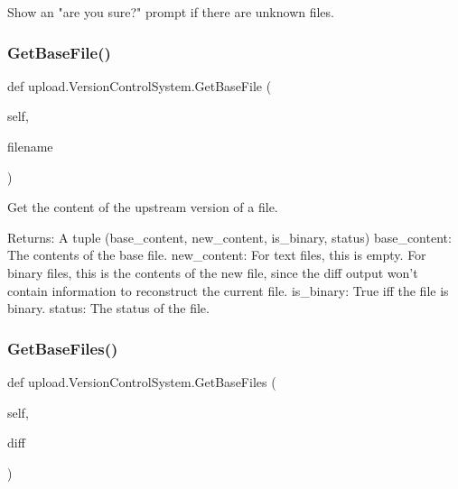 \begin{DoxyVerb}Show an "are you sure?" prompt if there are unknown files.\end{DoxyVerb}
 \mbox{\label{classupload_1_1_version_control_system_adfd9d4ecba422102233a2ba13e5bfaf5}} 
\subsubsection{\texorpdfstring{Get\+Base\+File()}{GetBaseFile()}}
{\footnotesize\ttfamily def upload.\+Version\+Control\+System.\+Get\+Base\+File (\begin{DoxyParamCaption}\item[{}]{self,  }\item[{}]{filename }\end{DoxyParamCaption})}

\begin{DoxyVerb}Get the content of the upstream version of a file.

Returns:
  A tuple (base_content, new_content, is_binary, status)
base_content: The contents of the base file.
new_content: For text files, this is empty.  For binary files, this is
  the contents of the new file, since the diff output won't contain
  information to reconstruct the current file.
is_binary: True iff the file is binary.
status: The status of the file.
\end{DoxyVerb}
 \mbox{\label{classupload_1_1_version_control_system_a812c3b3daf90c88b015fa4b26252e291}} 
\subsubsection{\texorpdfstring{Get\+Base\+Files()}{GetBaseFiles()}}
{\footnotesize\ttfamily def upload.\+Version\+Control\+System.\+Get\+Base\+Files (\begin{DoxyParamCaption}\item[{}]{self,  }\item[{}]{diff }\end{DoxyParamCaption})}

